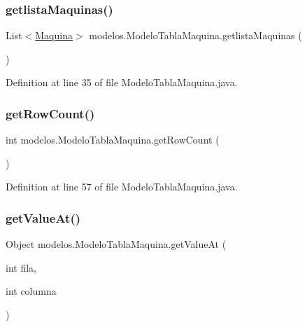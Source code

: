 \subsubsection{\texorpdfstring{getlista\+Maquinas()}{getlistaMaquinas()}}
{\footnotesize\ttfamily List$<$\mbox{\hyperlink{classobjetos_1_1_maquina}{Maquina}}$>$ modelos.\+Modelo\+Tabla\+Maquina.\+getlista\+Maquinas (\begin{DoxyParamCaption}{ }\end{DoxyParamCaption})}



Definition at line 35 of file Modelo\+Tabla\+Maquina.\+java.

\mbox{\label{classmodelos_1_1_modelo_tabla_maquina_aa380cce066ff74a0a7f95ae4d9388eb9}} 
\subsubsection{\texorpdfstring{get\+Row\+Count()}{getRowCount()}}
{\footnotesize\ttfamily int modelos.\+Modelo\+Tabla\+Maquina.\+get\+Row\+Count (\begin{DoxyParamCaption}{ }\end{DoxyParamCaption})}



Definition at line 57 of file Modelo\+Tabla\+Maquina.\+java.

\mbox{\label{classmodelos_1_1_modelo_tabla_maquina_ae6611198ecf631949ddb041b8231da95}} 
\subsubsection{\texorpdfstring{get\+Value\+At()}{getValueAt()}}
{\footnotesize\ttfamily Object modelos.\+Modelo\+Tabla\+Maquina.\+get\+Value\+At (\begin{DoxyParamCaption}\item[{int}]{fila,  }\item[{int}]{columna }\end{DoxyParamCaption})}



